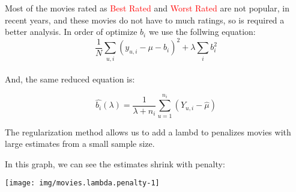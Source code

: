 \documentclass[]{article}
\begin{document}
Most of the movies rated as \textcolor{red}{Best Rated} and
\textcolor{red}{Worst Rated} are not popular, in recent years, and these
movies do not have to much ratings, so is required a better analysis. In
order of optimize \(b_{i}\) we use the follwing equation:
\[\frac{1}{N} \sum_{u,i} (y_{u,i} - \mu - b_{i})^{2} + \lambda \sum_{i} b_{i}^2\]\\
And, the same reduced equation is:

\[\hat{b_{i}} (\lambda) = \frac{1}{\lambda + n_{i}} \sum_{u=1}^{n_{i}} (Y_{u,i} - \hat{\mu}) \]

The regularization method allows us to add a lambd to penalizes movies
with large estimates from a small sample size.

In this graph, we can see the estimates shrink with penalty:

\begin{center}\texttt{[image: img/movies.lambda.penalty-1]} \end{center}
\end{document}
